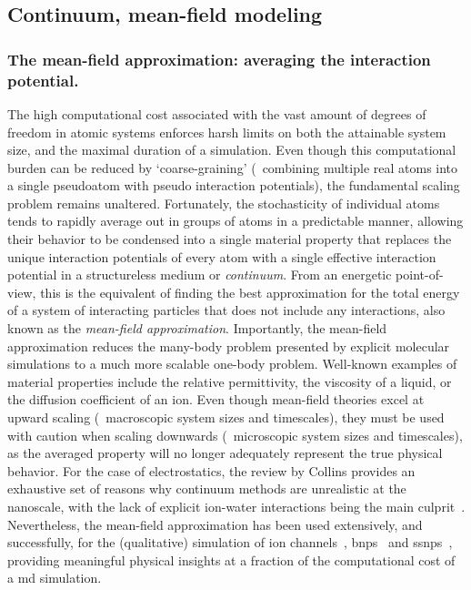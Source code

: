 

\subsection{Continuum, mean-field modeling}
%

\subsubsection{The mean-field approximation: averaging the interaction potential.}
%

The high computational cost associated with the vast amount of degrees of freedom in atomic systems enforces
harsh limits on both the attainable system size, and the maximal duration of a simulation. Even though this
computational burden can be reduced by `coarse-graining' (\ie~combining multiple real atoms into a single
pseudoatom with pseudo interaction potentials), the fundamental scaling problem remains unaltered.
Fortunately, the stochasticity of individual atoms tends to rapidly average out in groups of atoms in a
predictable manner, allowing their behavior to be condensed into a single material property that replaces the
unique interaction potentials of every atom with a single effective interaction potential in a structureless
medium or \emph{continuum}. From an energetic point-of-view, this is the equivalent of finding the best
approximation for the total energy of a system of interacting particles that does not include any
interactions, also known as the \emph{mean-field approximation}. Importantly, the mean-field approximation
reduces the many-body problem presented by explicit molecular simulations to a much more scalable one-body
problem. Well-known examples of material properties include the relative permittivity, the viscosity of a
liquid, or the diffusion coefficient of an ion. Even though mean-field theories excel at upward scaling
(\ie~macroscopic system sizes and timescales), they must be used with caution when scaling downwards
(\ie~microscopic system sizes and timescales), as the averaged property will no longer adequately represent
the true physical behavior. For the case of electrostatics, the review by Collins provides an exhaustive set
of reasons why continuum methods are unrealistic at the nanoscale, with the lack of explicit ion-water
interactions being the main culprit~\cite{Collins-2012}. Nevertheless, the mean-field approximation has been
used extensively, and successfully, for the (qualitative) simulation of ion
channels~\cite{Im-2002,Furini-2006,Liu-2015},
\glspl{bnp}~\cite{Simakov-2010,Pederson-2015,Aguilella-Arzo-2017,Simakov-2018} and
\glspl{ssnp}~\cite{Cervera-2005,White-2008,Chaudhry-2014,Laohakunakorn-2015}, providing meaningful physical
insights at a fraction of the computational cost of a \gls{md} simulation.



